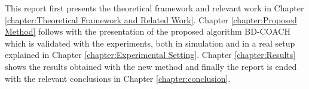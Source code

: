 \setlength{\parskip}{1em}

This report first presents the theoretical framework and relevant work in Chapter \ref{chapter:Theoretical Framework and Related Work}. Chapter \ref{chapter:Proposed Method} follows with the presentation of the proposed algorithm BD-COACH which is validated with the experiments, both in simulation and in a real setup explained in Chapter \ref{chapter:Experimental Setting}. Chapter \ref{chapter:Results} shows the results obtained with the new method and finally the report is ended with the relevant conclusions in Chapter \ref{chapter:conclusion}.

